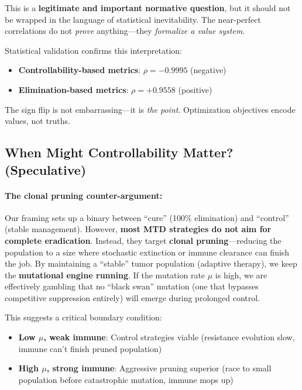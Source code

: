 \documentclass[11pt,a4paper]{article}
\begin{document}
This is a \textbf{legitimate and important normative question}, but it should not be wrapped in the language of statistical inevitability. The near-perfect correlations do not \textit{prove} anything---they \textit{formalize a value system}.

Statistical validation confirms this interpretation:

\begin{itemize}
    \item \textbf{Controllability-based metrics}: $\rho = -0.9995$ (negative)
    \item \textbf{Elimination-based metrics}: $\rho = +0.9558$ (positive)
\end{itemize}

The sign flip is not embarrassing---it is \textit{the point}. Optimization objectives encode values, not truths.

\subsection{When Might Controllability Matter? (Speculative)}

\paragraph{The clonal pruning counter-argument:} Our framing sets up a binary between ``cure'' (100\% elimination) and ``control'' (stable management). However, \textbf{most MTD strategies do not aim for complete eradication}. Instead, they target \textbf{clonal pruning}---reducing the population to a size where stochastic extinction or immune clearance can finish the job. By maintaining a ``stable'' tumor population (adaptive therapy), we keep the \textbf{mutational engine running}. If the mutation rate $\mu$ is high, we are effectively gambling that no ``black swan'' mutation (one that bypasses competitive suppression entirely) will emerge during prolonged control.

This suggests a critical boundary condition:
\begin{itemize}
    \item \textbf{Low $\mu$, weak immune}: Control strategies viable (resistance evolution slow, immune can't finish pruned population)
    \item \textbf{High $\mu$, strong immune}: Aggressive pruning superior (race to small population before catastrophic mutation, immune mops up)
\end{itemize}
\end{document}
